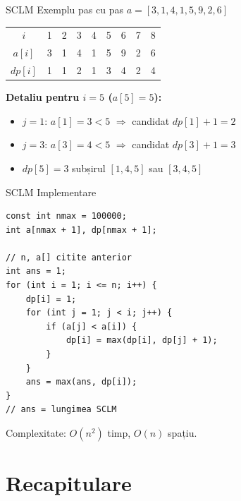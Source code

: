 \documentclass{beamer}
\begin{document}
\begin{frame}{SCLM \textemdash{} Exemplu pas cu pas}
  $a = [3, 1, 4, 1, 5, 9, 2, 6]$
  \smallskip
  \begin{center}
  \begin{tabular}{ccccccccc}
    \toprule
    $i$ & 1 & 2 & 3 & 4 & 5 & 6 & 7 & 8 \\
    $a[i]$ & 3 & 1 & 4 & 1 & 5 & 9 & 2 & 6 \\
    $dp[i]$ & 1 & 1 & 2 & 1 & 3 & 4 & 2 & 4 \\
    \bottomrule
  \end{tabular}
  \end{center}
  \smallskip
  \textbf{Detaliu pentru $i=5$ ($a[5]=5$):}
  \begin{itemize}\itemsep0pt
    \item $j=1$: $a[1]=3 < 5$ $\Rightarrow$ candidat $dp[1]+1 = 2$
    \item $j=3$: $a[3]=4 < 5$ $\Rightarrow$ candidat $dp[3]+1 = 3$
    \item $dp[5] = 3$ \textemdash{} subșirul $[1, 4, 5]$ sau $[3, 4, 5]$
  \end{itemize}
\end{frame}

\begin{frame}[fragile]{SCLM \textemdash{} Implementare}
  \begin{lstlisting}
const int nmax = 100000;
int a[nmax + 1], dp[nmax + 1];

// n, a[] citite anterior
int ans = 1;
for (int i = 1; i <= n; i++) {
    dp[i] = 1;
    for (int j = 1; j < i; j++) {
        if (a[j] < a[i]) {
            dp[i] = max(dp[i], dp[j] + 1);
        }
    }
    ans = max(ans, dp[i]);
}
// ans = lungimea SCLM
  \end{lstlisting}
  Complexitate: $O(n^2)$ timp, $O(n)$ spațiu.
\end{frame}

\section{Recapitulare}
\end{document}
